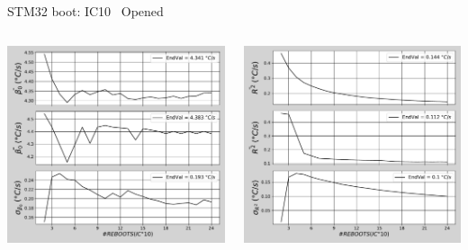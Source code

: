 \begin{frame}{STM32 boot: IC10 \textrightarrow\ Opened}
	\vspace{5mm}
	\begin{columns}
		\begin{column}{0.5\textwidth}
			\includegraphics[width=1.0\textwidth]{./figures/flistCircuit10_25_sl5_2beta0.pdf}
		\end{column}
		\begin{column}{0.5\textwidth}
			\includegraphics[width=1.0\textwidth]{./figures/flistCircuit10_25_sl5_2r2.pdf}
		\end{column}
	\end{columns}
\end{frame}

